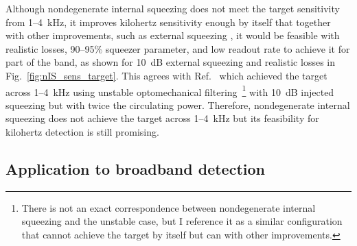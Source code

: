 Although nondegenerate internal squeezing does not meet the target sensitivity from 1--4~kHz, it improves kilohertz sensitivity enough by itself that together with other improvements, such as external squeezing , it would be feasible with realistic losses, 90--95$\%$ squeezer parameter, and low readout rate  to achieve it for part of the band, as shown for 10~dB external squeezing  and realistic losses in Fig.~\ref{fig:nIS_sens_target}. This agrees with Ref.~\cite{miaoDesignGravitationalWaveDetectors2018} which achieved the target across 1--4~kHz using unstable optomechanical filtering~\footnote{There is not an exact correspondence between nondegenerate internal squeezing and the unstable case, but I reference it as a similar configuration that cannot achieve the target by itself but can with other improvements.} with 10~dB injected squeezing but with twice the circulating power. %
Therefore, nondegenerate internal squeezing does not achieve the target across 1--4~kHz but its feasibility for kilohertz detection is still promising.


\subsection{Application to broadband detection}
\label{sec:signalRO_broadband}


